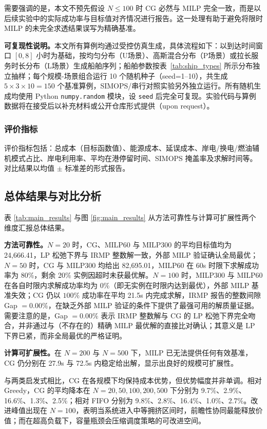 \documentclass[UTF8, a4paper, 12pt]{ctexart}
\theoremstyle{plain}
\theoremstyle{definition}
\theoremstyle{remark}
\begin{document}
需要强调的是，本文不预先假设 $N\le 100$ 时 CG 必然与 MILP 完全一致，而是以后续实验中的实际成功率与目标值对齐情况进行报告。这一处理有助于避免将限时 MILP 的未完全求透结果误写为精确基准。

\textbf{可复现性说明。}本文所有算例均通过受控仿真生成，具体流程如下：以到达时间窗口 $[0,8]$ 小时为基础，按均匀分布（U场景）、高斯混合分布（P场景）或拉长服务时长分布（L场景）生成船舶序列；船舶参数按表~\ref{tab:ship_types} 所示分布独立抽样；每个规模-场景组合运行 10 个随机种子（seed=1--10），共生成 $5 \times 3 \times 10 = 150$ 个基准算例，SIMOPS/串行对照实验另外独立运行。所有随机生成均使用 Python \texttt{numpy.random} 模块，设 \texttt{seed} 后完全可复现。实验代码与算例数据将在接受后以补充材料或公开仓库形式提供（upon request）。

\subsubsection{评价指标}
\label{sec:metrics}
评价指标包括：总成本（目标函数值）、能源成本、延误成本、岸电/换电/燃油辅机模式占比、岸电利用率、平均在港停留时间、SIMOPS 掩盖率及求解时间等。对比结果以均值 $\pm$ 标准差的形式报告。

\subsection{总体结果与对比分析}
\label{sec:overall_results}
表 \ref{tab:main_results} 与图 \ref{fig:main_results} 从方法可靠性与计算可扩展性两个维度汇报总体结果。

\textbf{方法可靠性。}$N=20$ 时，CG、MILP60 与 MILP300 的平均目标值均为 24{,}666.41，LP 松弛下界与 IRMP 整数解一致，外部 MILP 验证确认全局最优；$N=50$ 时，CG 与 MILP300 均给出 82{,}695.01，MILP60 在 60s 时限下求解成功率为 80\%，剩余 20\% 实例因超时未获最优解。$N=100$ 时，MILP300 与 MILP60 在各自时限内求解成功率均为 $0\%$（即无实例在时限内达到最优），外部 MILP 基准失效；CG 仍以 $100\%$ 成功率在平均 21.5s 内完成求解，IRMP 报告的整数间隙 Gap $= 0.00\%$，在缺乏外部 MILP 验证的条件下提供了最强可用的解质量证据。需要注意的是，Gap $= 0.00\%$ 表示 IRMP 整数解与 CG 的 LP 松弛下界完全吻合，并非通过与（不存在的）精确 MILP 最优解的直接比对确认；其意义是 LP 下界已紧，而非全局最优的严格证明。

\textbf{计算可扩展性。}在 $N=200$ 与 $N=500$ 下，MILP 已无法提供任何有效基准，CG 仍分别在 27.9s 与 72.5s 内稳定给出解，显示出良好的规模可扩展性。

与两类启发式相比，CG 在各规模下均保持成本优势，但优势幅度并非单调。相对 Greedy，CG 的平均降本在 $N=20,50,100,200,500$ 下分别为 9.7\%、2.9\%、16.6\%、1.3\%、2.5\%；相对 FIFO 分别为 9.8\%、2.8\%、16.4\%、1.0\%、2.7\%。改进峰值出现在 $N=100$，表明当系统进入中等拥挤区间时，前瞻性协同最能释放价值；而在超高负载下，容量瓶颈会压缩调度策略的可改进空间。
\end{document}
